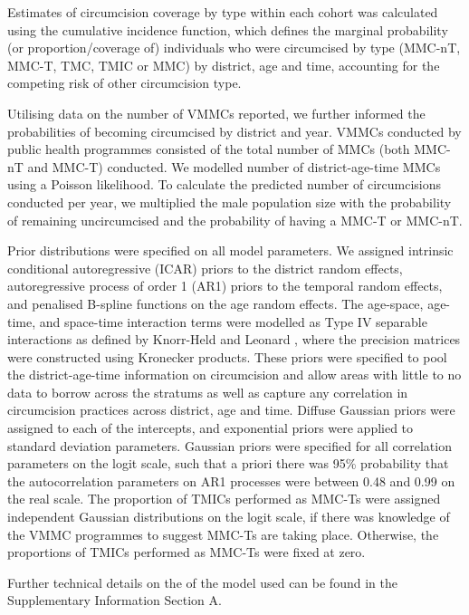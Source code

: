 \documentclass{article}
\begin{document}
Estimates of circumcision coverage by type within each cohort was calculated using the cumulative incidence function, which defines the marginal probability (or proportion/coverage of) individuals who were circumcised by type (MMC-nT, MMC-T, TMC, TMIC or MMC) by district, age and time, accounting for the competing risk of other circumcision type.

Utilising data on the number of VMMCs reported, we further informed the probabilities of becoming circumcised by district and year. VMMCs conducted by public health programmes consisted of the total number of MMCs (both MMC-nT and MMC-T) conducted. We modelled number of district-age-time MMCs using a Poisson likelihood. To calculate the predicted number of circumcisions conducted per year, we multiplied the male population size with the probability of remaining uncircumcised and the probability of having a MMC-T or MMC-nT. 

Prior distributions were specified on all model parameters. We assigned intrinsic conditional autoregressive (ICAR) priors \autocite{besag1995conditional} to the district random effects, autoregressive process of order 1 (AR1) priors to the temporal random effects, and penalised B-spline functions on the age random effects. The age-space, age-time, and space-time interaction terms were modelled as Type IV separable interactions as defined by Knorr-Held and Leonard \autocite{knorr2000bayesian}, where the precision matrices were constructed using Kronecker products. These priors were specified to pool the district-age-time information on circumcision and allow areas with little to no data to borrow across the stratums as well as capture any correlation in circumcision practices across district, age and time. Diffuse Gaussian priors were assigned to each of the intercepts, and exponential priors were applied to standard deviation parameters. Gaussian priors were specified for all correlation parameters on the logit scale, such that a priori there was 95\% probability that the autocorrelation parameters on AR1 processes were between 0.48 and 0.99 on the real scale. The proportion of TMICs performed as MMC-Ts were assigned independent Gaussian distributions on the logit scale, if there was knowledge of the VMMC programmes to suggest MMC-Ts are taking place. Otherwise, the proportions of TMICs performed as MMC-Ts were fixed at zero. 

Further technical details on the of the model used can be found in the Supplementary Information Section A. 
\end{document}
